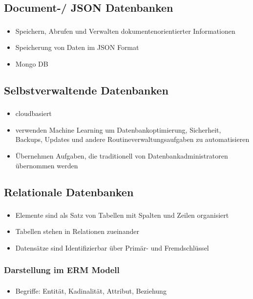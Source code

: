 \documentclass[aspectratio=169,14pt,xcolor=dvipsnames]{beamer}
\begin{document}
\subsection{Document-/ JSON Datenbanken}
\begin{frame}[t]
    \frametitle{\secname}
    \framesubtitle{\subsecname}
    \begin{itemize}
        \item Speichern, Abrufen und Verwalten dokumentenorientierter Informationen
        \item Speicherung von Daten im JSON Format
        \item Mongo DB
    \end{itemize}
\end{frame}

\subsection{Selbstverwaltende Datenbanken}
\begin{frame}[t]
    \frametitle{\secname}
    \framesubtitle{\subsecname}
    \begin{itemize}
        \item cloudbasiert
        \item verwenden Machine Learning um Datenbankoptimierung, Sicherheit, Backups, Updates und andere Routineverwaltungsaufgaben zu automatisieren
        \item Übernehmen Aufgaben, die traditionell von Datenbankadministratoren übernommen werden
    \end{itemize}
\end{frame}

\subsection{Relationale Datenbanken}
\begin{frame}[t]
    \frametitle{\secname}
    \framesubtitle{\subsecname}
    \begin{itemize}
        \item Elemente sind als Satz von Tabellen mit Spalten und Zeilen organisiert
        \item Tabellen stehen in Relationen zueinander
        \item Datensätze sind Identifizierbar über Primär- und Fremdschlüssel
    \end{itemize}
\end{frame}

\subsubsection{Darstellung im ERM Modell}
\begin{frame}[t]
    \frametitle{\subsecname}
    \framesubtitle{\subsubsecname}
    \begin{itemize}
        \item Begriffe: Entität, Kadinalität, Attribut, Beziehung
    \end{itemize}
\end{frame}
\end{document}
